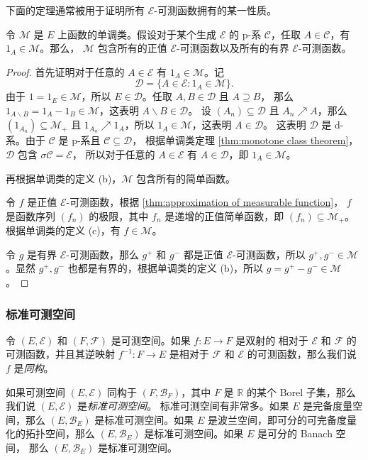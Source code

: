 \documentclass[fontset=none]{Notes}
\begin{document}
下面的定理通常被用于证明所有 $\mathcal{E}$-可测函数拥有的某一性质。

\begin{theorem}
  令 $\mathcal{M}$ 是 $E$ 上函数的单调类。假设对于某个生成 $\mathcal{E}$
  的 p-系 $\mathcal{C}$，任取 $A\in \mathcal{C}$，有 $1_A\in \mathcal{M}$。那么，
  $\mathcal{M}$ 包含所有的正值 $\mathcal{E}$-可测函数以及所有的有界 $\mathcal{E}$-可测函数。
\end{theorem} 
\begin{proof}
  首先证明对于任意的 $A\in \mathcal{E}$ 有 $1_A\in \mathcal{M}$。记
  \[
    \mathcal{D}=\{A\in \mathcal{E}:1_A\in \mathcal{M}\}.
  \]
  由于 $1=1_E\in \mathcal{M}$，所以 $E\in \mathcal{D}$。任取 $A,B\in \mathcal{D}$ 且 $A\supseteq B$，
  那么 $1_{A \smallsetminus B}=1_A-1_B\in \mathcal{M}$，这表明 $A \smallsetminus B\in \mathcal{D}$。
  设 $(A_n)\subseteq \mathcal{D}$ 且 $A_n\nearrow A$，那么 $(1_{A_n})\subseteq \mathcal{M}_+$
  且 $1_{A_n}\nearrow 1_A$，所以 $1_A\in \mathcal{M}$，这表明 $A\in \mathcal{D}$。
  这表明 $\mathcal{D}$ 是 d-系。由于 $\mathcal{C}$ 是 p-系且 $\mathcal{C}\subseteq \mathcal{D}$，
  根据单调类定理 \ref{thm:monotone class theorem}，$\mathcal{D}$ 包含 $\sigma \mathcal{C}=\mathcal{E}$，
  所以对于任意的 $A\in \mathcal{E}$ 有 $A\in \mathcal{D}$，即 $1_A\in \mathcal{M}$。

  再根据单调类的定义 (b)，$\mathcal{M}$ 包含所有的简单函数。

  令 $f$ 是正值 $\mathcal{E}$-可测函数，根据 \autoref{thm:approximation of measurable function}，
  $f$ 是函数序列 $(f_n)$ 的极限，其中 $f_n$ 是递增的正值简单函数，即 $(f_n)\subseteq \mathcal{M}_+$。
  根据单调类的定义 (c)，有 $f\in \mathcal{M}$。

  令 $g$ 是有界 $\mathcal{E}$-可测函数，那么 $g^+$ 和 $g^-$ 都是正值 $\mathcal{E}$-可测函数，所以
  $g^+,g^-\in \mathcal{M}$。显然 $g^+,g^-$ 也都是有界的，根据单调类的定义 (b)，所以
  $g=g^+-g^-\in \mathcal{M}$。
\end{proof}

\subsubsection{标准可测空间}

令 $(E,\mathcal{E})$ 和 $(F,\mathcal{F})$ 是可测空间。如果 $f:E\to F$ 是双射的
相对于 $\mathcal{E}$ 和 $\mathcal{F}$ 的可测函数，并且其逆映射 $f^{-1}:F\to E$
是相对于 $\mathcal{F}$ 和 $\mathcal{E}$ 的可测函数，那么我们说 $f$ 是\emph{同构}。

如果可测空间 $(E,\mathcal{E})$ 同构于 $(F,\mathcal{B}_F)$，其中 $F$ 是 $\mathbb{R}$
的某个 Borel 子集，那么我们说 $(E,\mathcal{E})$ 是\emph{标准可测空间}。
标准可测空间有非常多。如果 $E$ 是完备度量空间，那么 $(E,\mathcal{B}_E)$
是标准可测空间。如果 $E$ 是波兰空间，即可分的可完备度量化的拓扑空间，那么
$(E,\mathcal{B}_E)$ 是标准可测空间。如果 $E$ 是可分的 Banach 空间，
那么 $(E,\mathcal{B}_E)$ 是标准可测空间。
\end{document}
